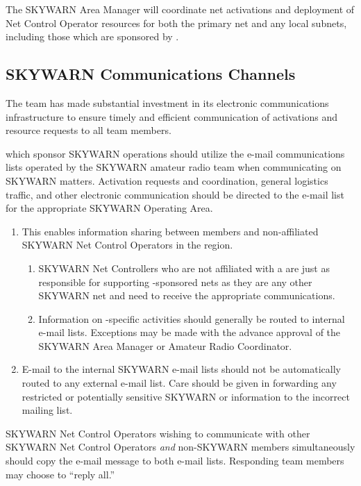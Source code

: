 \documentclass[pdflatex,letterpaper,twoside,12pt]{book}
\begin{document}
The SKYWARN Area Manager will coordinate net activations and deployment of Net Control Operator resources for both the primary net and any local subnets, including those which are sponsored by \tpteams.


\subsection{SKYWARN Communications Channels}

The team has made substantial investment in its electronic communications infrastructure to ensure timely and efficient communication of activations and resource requests to all team members.

\tpteams which sponsor SKYWARN operations should utilize the e-mail communications lists operated by the SKYWARN amateur radio team when communicating on SKYWARN matters.  Activation requests and coordination, general logistics traffic, and other electronic communication should be directed to the e-mail list for the appropriate SKYWARN Operating Area.

\begin{enumerate}
\item This enables information sharing between \tpteam members and non-affiliated SKYWARN Net Control Operators in the region.
\begin{enumerate}
\item SKYWARN Net Controllers who are not affiliated with a \tpteam are just as responsible for supporting \tpteam-sponsored nets as they are any other SKYWARN net and need to receive the appropriate communications.
\item Information on \tpteam-specific activities should generally be routed to \tpteam internal e-mail lists.  Exceptions may be made with the advance approval of the SKYWARN Area Manager or Amateur Radio Coordinator.
\end{enumerate}
\item E-mail to the internal SKYWARN e-mail lists should not be automatically routed to any external e-mail list.  Care should be given in forwarding any restricted or potentially sensitive SKYWARN or \tpteam information to the incorrect mailing list.
\end{enumerate}

SKYWARN Net Control Operators wishing to communicate with other SKYWARN Net Control Operators \emph{and} non-SKYWARN \tpteam members simultaneously should copy the e-mail message to both e-mail lists.  Responding team members may choose to ``reply all.''
\end{document}
